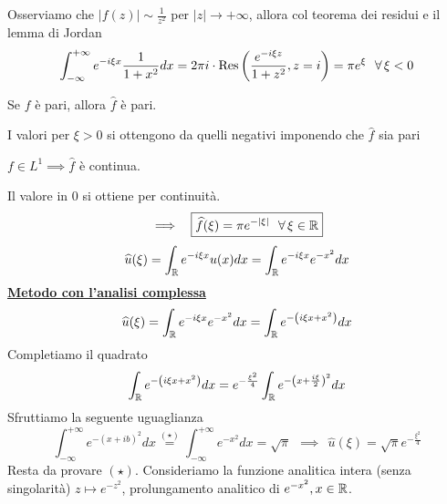 \begin{figure}[htpb]
\end{figure}
\FloatBarrier

Osserviamo che $| f(z)| \sim \frac{1}{z^{2}}$ per $| z| \rightarrow + \infty $, allora col teorema dei residui e il lemma di Jordan
\begin{equation*}
\int^{+ \infty}_{- \infty} e^{- i\xi x}\frac{1}{1 + x^{2}} dx = 2\pi i \cdot \Res \left(\frac{e^{- i\xi z}}{1 + z^{2}}, z = i\right) = \pi e^{\xi} \ \ \forall \xi < 0
\end{equation*}
\begin{rem}
Se $f$ è pari, allora $\hat{f}$ è pari.
\end{rem}
I valori per $\xi  > 0$ si ottengono da quelli negativi imponendo che $\hat{f}$ sia pari
\begin{rem}
$f\in L^{1} \implies \hat{f}$ è continua.
\end{rem}
Il valore in $0$ si ottiene per continuità.
\begin{equation*}
\implies \ \ \boxed{\hat{f}(\xi) = \pi e^{- | \xi |} \ \ \forall \xi \in \RR}
\end{equation*}
\Soluzione
\begin{equation*}
\widehat{u}(\xi) = \int_{\mathbb{R}} e^{- i\xi x} u(x) dx = \int_{\mathbb{R}} e^{- i\xi x} e^{- x^{2}} dx
\end{equation*}
\textbf{\underline{Metodo con l'analisi complessa}}
\begin{equation*}
\widehat{u}(\xi) = \int_{\mathbb{R}} e^{- i\xi x} e^{- x^{2}} dx = \int_{\mathbb{R}} e^{- \left(i\xi x + x^{2}\right)} dx
\end{equation*}
Completiamo il quadrato
\begin{equation*}
\int_{\mathbb{R}} e^{- \left(i\xi x + x^{2}\right)} dx = e^{- \frac{\xi^{2}}{4}}\int_{\mathbb{R}} e^{- \left(x + \frac{i\xi}{2}\right)^{2}} dx
\end{equation*}
Sfruttiamo la seguente uguaglianza
\begin{equation*}
\int^{+ \infty}_{- \infty} e^{- (x + ib)^{2}} dx\overset{(\star)}{=}\int^{+ \infty}_{- \infty} e^{- x^{2}} dx = \sqrt{\pi} \ \ \implies \ \ \boxed{\hat{u}(\xi) = \sqrt{\pi} e^{- \frac{\xi^{2}}{4}}}
\end{equation*}
Resta da provare $(\star)$. Consideriamo la funzione analitica intera (senza singolarità) $z\mapsto e^{- z^{2}}$, prolungamento analitico di $e^{- x^{2}}, x\in \mathbb{R} $.


